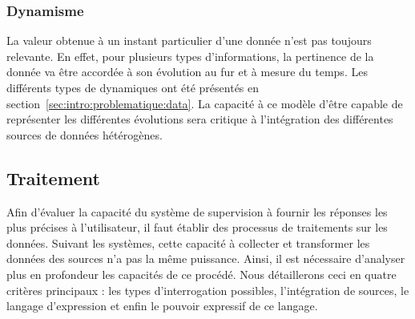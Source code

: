 \subsubsection{Dynamisme}
La valeur obtenue à un instant particulier d'une donnée n'est pas toujours relevante. En effet, pour plusieurs types d'informations, la pertinence de la donnée va être accordée à son évolution au fur et à mesure du temps. Les différents types de dynamiques ont été présentés en section~\ref{sec:intro:problematique:data}. La capacité à ce modèle d'être capable de représenter les différentes évolutions sera critique à l'intégration des différentes sources de données hétérogènes.

\subsection{Traitement}\label{sec:rw:supervision:criteres:traitement}
Afin d'évaluer la capacité du système de supervision à fournir les réponses les plus précises à l'utilisateur, il faut établir des processus de traitements sur les données. Suivant les systèmes, cette capacité à collecter et transformer les données des sources n'a pas la même puissance. Ainsi, il est nécessaire d'analyser plus en profondeur les capacités de ce procédé. Nous détaillerons ceci en quatre critères principaux : les types d'interrogation possibles, l'intégration de sources, le langage d'expression et enfin le pouvoir expressif de ce langage.

